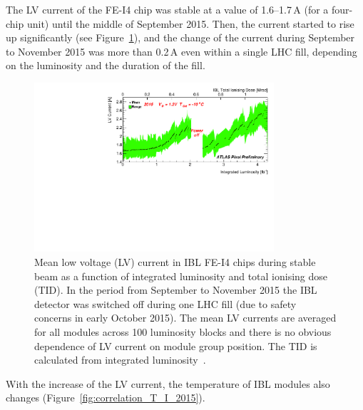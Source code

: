 The LV current of the FE-I4 chip was stable at a value of 1.6--1.7\,A (for a four-chip unit) until the middle of September 2015.  Then, the current started to rise up significantly (see Figure~\ref{fig:IBL_LVdrift2015}), and the change of the current during September to November 2015 was more than 0.2\,A even within a single LHC fill, depending on the luminosity and the duration of the fill.

\begin{figure}[h!]
\centering
\includegraphics[width=3.5in]{figures/ElectronicsChapter/ATLAS/IBL_LVdrift2015.pdf}
\caption{Mean low voltage (LV) current in IBL FE-I4 chips during stable beam as a function of integrated luminosity and total ionising dose (TID). In the period from September to November 2015 the IBL detector was switched off during one LHC fill (due to safety concerns in early October 2015). The mean LV currents are averaged for all modules across 100 luminosity blocks and there is no obvious dependence of LV current on module group position. The TID is calculated from integrated luminosity~\cite{TaskForceNote}.}
\label{fig:IBL_LVdrift2015}
\end{figure}

With the increase of the LV current, the temperature of IBL modules also changes (Figure~\ref{fig:correlation_T_I_2015}).

